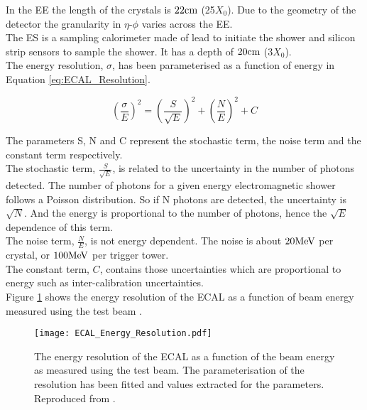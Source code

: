 In the EE the length of the crystals is $22\mbox{cm}$ (25$X_{0}$). Due to the geometry
of the detector the granularity in $\eta$-$\phi$ varies across the EE. \\

The ES is a sampling calorimeter made of lead to initiate the shower and
silicon strip sensors to sample the shower. It has a depth of $20\mbox{cm}$ 
($3X_{0}$). \\

The energy resolution, $\sigma$, has been parameterised as a function of energy 
in Equation \ref{eq:ECAL_Resolution}. 

\begin{equation}
\left( \frac{\sigma}{E} \right)^{2} = \left( \frac{S}{\sqrt{E}} \right)^{2} +
\left( \frac{N}{E} \right)^{2} + C
\label{eq:ECAL_Resolution}
\end{equation}

The parameters S, N and C represent the stochastic term, the noise term and the
constant term respectively. \\

The stochastic term, $\frac{S}{\sqrt{E}}$, is related to the uncertainty in the 
number of photons detected. The number of photons for a given energy 
electromagnetic shower follows a Poisson distribution. So if N photons are 
detected, the uncertainty is $\sqrt{N}$. And the energy is proportional to the 
number of photons, hence the $\sqrt{E}$ dependence of this term. \\

The noise term, $\frac{N}{E}$, is not energy dependent. The noise is about $20
\mbox{MeV}$ per crystal, or $100\mbox{MeV}$ per trigger tower. \\

The constant term, $C$, contains those uncertainties which are proportional to
energy such as inter-calibration uncertainties. \\

Figure \ref{fig:ECAL_Energy_Resolution} shows the energy resolution of the ECAL
as a function of beam energy measured using the test beam \cite{test_beam}.

\begin{figure}
\begin{center}
\texttt{[image: ECAL\_Energy\_Resolution.pdf]}
\end{center}
\caption{The energy resolution of the ECAL as a function of the beam energy as
measured using the test beam. The parameterisation of the resolution has been 
fitted and values extracted for the parameters. Reproduced from
\cite{test_beam}.}
\label{fig:ECAL_Energy_Resolution}
\end{figure}

